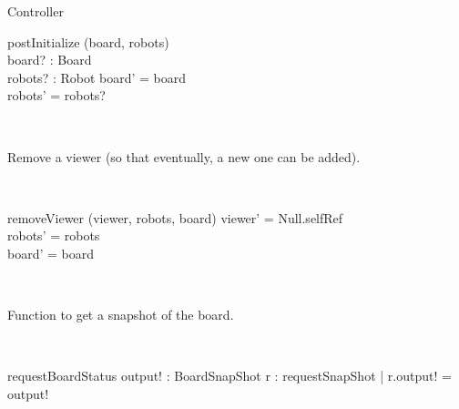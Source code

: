 \begin{class}{Controller}
\begin{schema}{postInitialize}
\Delta (board, robots) \\
board? : Board \\
robots? : \power Robot
\where
board' = board \\
robots' = robots?
\end{schema}\\
\begin{classcom}
Remove a viewer (so that eventually, a new one can be added).
\end{classcom} \\
\begin{schema}{removeViewer}
\Delta (viewer, robots, board)
\where
viewer' = Null.selfRef \\
robots' = robots \\
board' = board
\end{schema}\\
\begin{classcom}
Function to get a snapshot of the board.
\end{classcom} \\
\begin{schema}{requestBoardStatus}
output! : BoardSnapShot
\where
\exists r : requestSnapShot | r.output! = output!
\end{schema}
\end{class}
